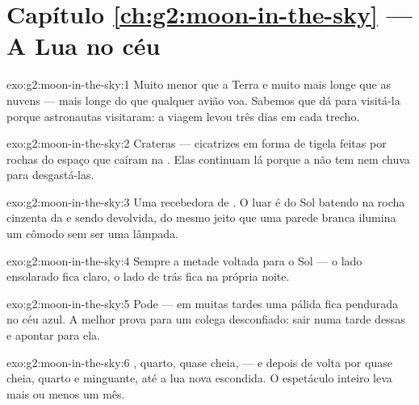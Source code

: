 \section*{Capítulo \ref{ch:g2:moon-in-the-sky} --- A Lua no céu}

\begin{solution}{exo:g2:moon-in-the-sky:1}
Muito menor que a Terra e muito mais longe que as nuvens --- mais
longe do que qualquer avião voa. Sabemos que dá para visitá-la porque
astronautas visitaram: a viagem levou três dias em cada trecho.
\end{solution}

\begin{solution}{exo:g2:moon-in-the-sky:2}
Crateras --- cicatrizes em forma de tigela feitas por rochas do
espaço que caíram na . Elas continuam lá porque a  não tem
 nem chuva para desgastá-las.
\end{solution}

\begin{solution}{exo:g2:moon-in-the-sky:3}
Uma recebedora de . O luar é  do Sol batendo na rocha cinzenta
da  e sendo devolvida, do mesmo jeito que uma parede branca
ilumina um cômodo sem ser uma lâmpada.
\end{solution}

\begin{solution}{exo:g2:moon-in-the-sky:4}
Sempre a metade voltada para o Sol --- o lado ensolarado fica claro,
o lado de trás fica na própria noite.
\end{solution}

\begin{solution}{exo:g2:moon-in-the-sky:5}
Pode --- em muitas tardes uma  pálida fica pendurada no céu azul.
A melhor prova para um colega desconfiado: sair numa tarde dessas e
apontar para ela.
\end{solution}

\begin{solution}{exo:g2:moon-in-the-sky:6}
, quarto, quase cheia,  --- e depois de volta
por quase cheia, quarto e minguante, até a lua nova escondida. O
espetáculo inteiro leva mais ou menos um mês.
\end{solution}

